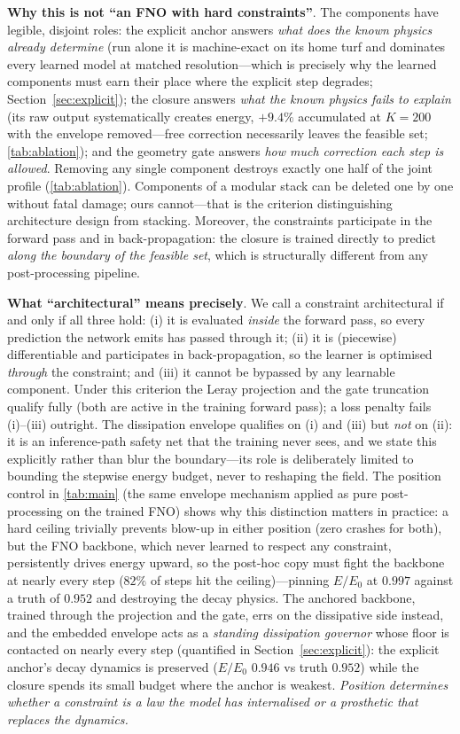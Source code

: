 \documentclass[11pt,a4paper]{article}
\begin{document}
\textbf{Why this is not ``an FNO with hard constraints''}. The components have legible, disjoint roles: the explicit anchor answers \emph{what does the known physics already determine} (run alone it is machine-exact on its home turf and dominates every learned model at matched resolution---which is precisely why the learned components must earn their place where the explicit step degrades; Section~\ref{sec:explicit}); the closure answers \emph{what the known physics fails to explain} (its raw output systematically creates energy, $+9.4\%$ accumulated at $K{=}200$ with the envelope removed---free correction necessarily leaves the feasible set; \ref{tab:ablation}); and the geometry gate answers \emph{how much correction each step is allowed}. Removing any single component destroys exactly one half of the joint profile (\ref{tab:ablation}). Components of a modular stack can be deleted one by one without fatal damage; ours cannot---that is the criterion distinguishing architecture design from stacking. Moreover, the constraints participate in the forward pass and in back-propagation: the closure is trained directly to predict \emph{along the boundary of the feasible set}, which is structurally different from any post-processing pipeline.

\textbf{What ``architectural'' means precisely}. We call a constraint architectural if and only if all three hold: (i) it is evaluated \emph{inside} the forward pass, so every prediction the network emits has passed through it; (ii) it is (piecewise) differentiable and participates in back-propagation, so the learner is optimised \emph{through} the constraint; and (iii) it cannot be bypassed by any learnable component. Under this criterion the Leray projection and the gate truncation qualify fully (both are active in the training forward pass); a loss penalty fails (i)--(iii) outright. The dissipation envelope qualifies on (i) and (iii) but \emph{not} on (ii): it is an inference-path safety net that the training never sees, and we state this explicitly rather than blur the boundary---its role is deliberately limited to bounding the stepwise energy budget, never to reshaping the field. The position control in \ref{tab:main} (the same envelope mechanism applied as pure post-processing on the trained FNO) shows why this distinction matters in practice: a hard ceiling trivially prevents blow-up in either position (zero crashes for both), but the FNO backbone, which never learned to respect any constraint, persistently drives energy upward, so the post-hoc copy must fight the backbone at nearly every step ($82\%$ of steps hit the ceiling)---pinning $E/E_0$ at $0.997$ against a truth of $0.952$ and destroying the decay physics. The anchored backbone, trained through the projection and the gate, errs on the dissipative side instead, and the embedded envelope acts as a \emph{standing dissipation governor} whose floor is contacted on nearly every step (quantified in Section~\ref{sec:explicit}): the explicit anchor's decay dynamics is preserved ($E/E_0$ $0.946$ vs truth $0.952$) while the closure spends its small budget where the anchor is weakest. \emph{Position determines whether a constraint is a law the model has internalised or a prosthetic that replaces the dynamics.}
\end{document}
